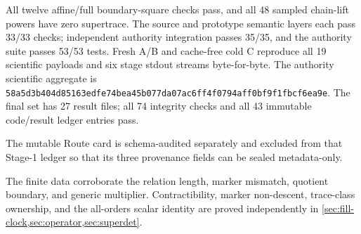 All twelve affine/full boundary-square checks pass, and all 48 sampled
chain-lift powers have zero supertrace.  The source and prototype semantic
layers each pass 33/33 checks; independent authority integration passes
35/35, and the authority suite passes 53/53 tests.  Fresh A/B and cache-free
cold C reproduce all 19 scientific payloads and six stage stdout streams
byte-for-byte.  The authority scientific aggregate is
\nolinkurl{58a5d3b404d85163edfe74bea45b077da07ac6ff4f0794aff0bf9f1fbcf6ea9e}.
The final set has 27 result files; all 74 integrity checks and all 43
immutable code/result ledger entries pass.

\pagebreak[4]
The mutable Route card is schema-audited separately and excluded from that
Stage-1 ledger so that its three provenance fields can be sealed metadata-only.

The finite data corroborate the relation length, marker mismatch, quotient
boundary, and generic multiplier.  Contractibility, marker non-descent,
trace-class ownership, and the all-orders scalar identity are proved
independently in \cref{sec:fill-clock,sec:operator,sec:superdet}.
